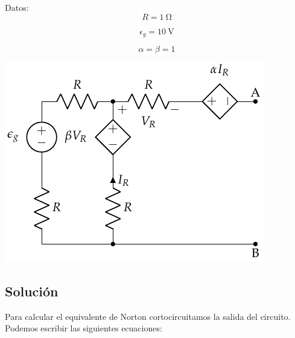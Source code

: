 \documentclass[12pt]{article}
\begin{document}
\begin{minipage}{0.3\linewidth}
Datos:
\[
  R = \SI{1}{\ohm}
\]

\[
\epsilon_g = \SI{10}{\volt}
\]

\[
  \alpha = \beta = 1
\]

\end{minipage}
\begin{minipage}{0.7\linewidth}
\includegraphics[width=.9\linewidth]{../figs/norton.pdf}
\end{minipage}

\subsection*{Solución}

Para calcular el equivalente de Norton cortocircuitamos la salida del circuito. Podemos escribir las siguientes ecuaciones:
\end{document}
